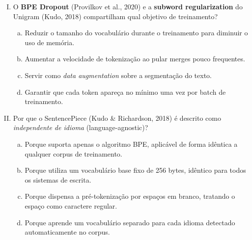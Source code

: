 \documentclass{dlproblemset}
\begin{document}
\begin{enumerate}[I)]
\begin{enumerate}[a)]
    \item O Unigram usa merges guiados por frequência de bigramas, enquanto o BPE
          usa verossimilhança.
    \item O Unigram é top-down: parte de um vocabulário grande e itera removendo
          os tokens menos úteis.
    \item O Unigram aplica dropout nos merges durante o treinamento, enquanto o BPE
          usa merges determinísticos.
    \item O Unigram é restrito a modelos que usam SentencePiece, enquanto o BPE pode
          ser usado com qualquer framework.
\end{enumerate}

\item O \textbf{BPE Dropout} (Provilkov et al., 2020) e a \textbf{subword
      regularization} do Unigram (Kudo, 2018) compartilham qual objetivo de
      treinamento?

\begin{enumerate}[a)]
    \item Reduzir o tamanho do vocabulário durante o treinamento para diminuir o
          uso de memória.
    \item Aumentar a velocidade de tokenização ao pular merges pouco frequentes.
    \item Servir como \emph{data augmentation} sobre a segmentação do texto.
    \item Garantir que cada token apareça no mínimo uma vez por batch de treinamento.
\end{enumerate}

\item Por que o SentencePiece (Kudo \& Richardson, 2018) é descrito como
      \emph{independente de idioma} (language-agnostic)?

\begin{enumerate}[a)]
    \item Porque suporta apenas o algoritmo BPE, aplicável de forma idêntica a
          qualquer corpus de treinamento.
    \item Porque utiliza um vocabulário base fixo de 256 bytes, idêntico para
          todos os sistemas de escrita.
    \item Porque dispensa a pré-tokenização por espaços em branco, tratando o
          espaço como caractere regular.
    \item Porque aprende um vocabulário separado para cada idioma detectado
          automaticamente no corpus.
\end{enumerate}


\end{enumerate}
\end{document}
